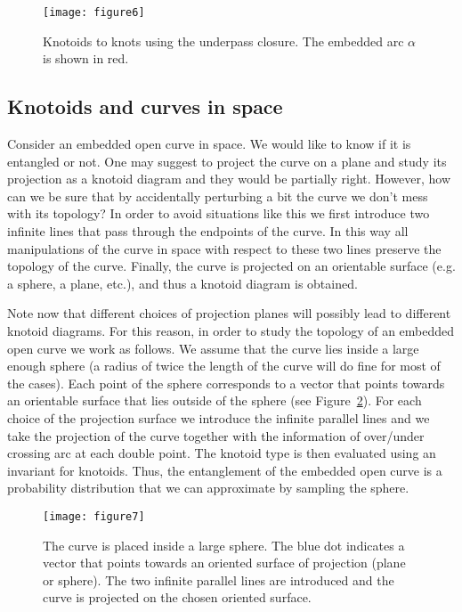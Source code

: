 \begin{figure}[h]
\centering
\texttt{[image: figure6]}
\caption{Knotoids to knots using the underpass closure. The embedded arc $\alpha$ is shown in red.}\label{fig:closure}
\end{figure}





\subsection{\label{sec:theory:knotoidsandcurves}Knotoids and curves in space}

Consider an embedded open curve in space. We would like to know if it is entangled or not. One may suggest to project the curve on a plane and study its projection as a knotoid diagram and they would be partially right. However, how can we be sure that by accidentally perturbing a bit the curve we don't mess with its topology? In order to avoid situations like this we first introduce two infinite lines that pass through the endpoints of the curve. In this way all manipulations of the curve in space with respect to these two lines preserve the topology of the curve\cite{guka}. Finally, the curve is projected on  an orientable surface (e.g. a sphere, a plane, etc.), and thus a knotoid diagram is obtained. 

Note now that different choices of projection planes will possibly lead to different knotoid diagrams. For this reason, in order to study the topology of an embedded open curve we work as follows. We assume that the curve lies inside a large enough sphere (a radius of twice the length of the curve will do fine for most of the cases). Each point of the sphere corresponds to a vector that points towards an orientable surface that lies outside of the sphere (see Figure~\ref{fig:project}). For each choice of the projection surface we introduce the infinite parallel lines and we take the projection of the curve together with the information of over/under crossing arc at each double point. The knotoid type is then evaluated using an invariant for knotoids. Thus, the entanglement of the embedded open curve is a probability distribution that we can approximate by sampling the sphere\cite{gound}.
\begin{figure}[h]
\centering
\texttt{[image: figure7]}
\caption{ The curve is placed inside a large sphere. The blue dot indicates a vector that points towards an oriented surface of projection (plane or sphere). The two infinite parallel lines are introduced and the curve is projected on the chosen oriented surface.}\label{fig:project}
\end{figure}


